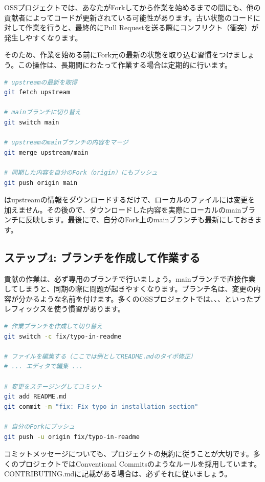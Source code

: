 OSSプロジェクトでは、あなたがForkしてから作業を始めるまでの間にも、他の貢献者によってコードが更新されている可能性があります。古い状態のコードに対して作業を行うと、最終的にPull Requestを送る際にコンフリクト（衝突）が発生しやすくなります。

そのため、作業を始める前にFork元の最新の状態を取り込む習慣をつけましょう。この操作は、長期間にわたって作業する場合は定期的に行います。

\begin{lstlisting}[language=bash]
# upstreamの最新を取得
git fetch upstream

# mainブランチに切り替え
git switch main

# upstreamのmainブランチの内容をマージ
git merge upstream/main

# 同期した内容を自分のFork（origin）にもプッシュ
git push origin main
\end{lstlisting}

はupstreamの情報をダウンロードするだけで、ローカルのファイルには変更を加えません。その後ので、ダウンロードした内容を実際にローカルのmainブランチに反映します。最後にで、自分のFork上のmainブランチも最新にしておきます。

\subsection{ステップ4: ブランチを作成して作業する}

貢献の作業は、必ず専用のブランチで行いましょう。mainブランチで直接作業してしまうと、同期の際に問題が起きやすくなります。ブランチ名は、変更の内容が分かるような名前を付けます。多くのOSSプロジェクトでは、、、といったプレフィックスを使う慣習があります。

\begin{lstlisting}[language=bash]
# 作業ブランチを作成して切り替え
git switch -c fix/typo-in-readme

# ファイルを編集する（ここでは例としてREADME.mdのタイポ修正）
# ... エディタで編集 ...

# 変更をステージングしてコミット
git add README.md
git commit -m "fix: Fix typo in installation section"

# 自分のForkにプッシュ
git push -u origin fix/typo-in-readme
\end{lstlisting}

コミットメッセージについても、プロジェクトの規約に従うことが大切です。多くのプロジェクトではConventional Commitsのようなルールを採用しています。CONTRIBUTING.mdに記載がある場合は、必ずそれに従いましょう。

